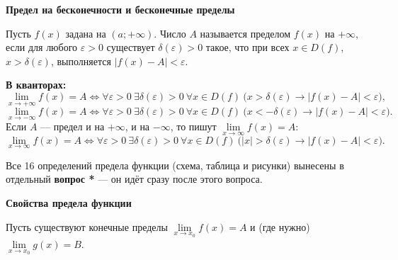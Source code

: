 \documentclass[a4paper,11pt]{article}
\newcommand{\eps}{\varepsilon}
\newcommand{\kv}{\par\noindent\textbf{\textcolor{oprc!85!black}{В кванторах:}}}
\newcommand{\podr}[1]{\par\needspace{8\baselineskip}\medskip
  {\large\bfseries\textcolor{oprc!80!black}{#1}}\par\nopagebreak\smallskip}
\begin{document}
\podr{Предел на бесконечности и бесконечные пределы}

\begin{opr}
Пусть $f(x)$ задана на $(a; +\infty)$. Число $A$ называется пределом $f(x)$ на $+\infty$, если для любого $\eps > 0$ существует
$\delta(\eps) > 0$ такое, что при всех $x \in D(f)$, $x > \delta(\eps)$, выполняется $|f(x) - A| < \eps$.
\kv
\[
  \lim_{x \to +\infty} f(x) = A \Leftrightarrow \forall \eps > 0\ \exists \delta(\eps) > 0\
  \forall x \in D(f)\ \bigl( x > \delta(\eps) \to |f(x) - A| < \eps \bigr),
\]
\[
  \lim_{x \to -\infty} f(x) = A \Leftrightarrow \forall \eps > 0\ \exists \delta(\eps) > 0\
  \forall x \in D(f)\ \bigl( x < -\delta(\eps) \to |f(x) - A| < \eps \bigr).
\]
Если $A$ --- предел и на $+\infty$, и на $-\infty$, то пишут $\lim\limits_{x \to \infty} f(x) = A$:
\[
  \lim_{x \to \infty} f(x) = A \Leftrightarrow \forall \eps > 0\ \exists \delta(\eps) > 0\
  \forall x \in D(f)\ \bigl( |x| > \delta(\eps) \to |f(x) - A| < \eps \bigr).
\]
\end{opr}

Все 16 определений предела функции (схема, таблица и рисунки) вынесены в отдельный \textbf{вопрос *} --- он идёт сразу после этого вопроса.

\podr{Свойства предела функции}

Пусть существуют конечные пределы $\lim\limits_{x \to x_0} f(x) = A$ и (где нужно) $\lim\limits_{x \to x_0} g(x) = B$.
\end{document}
